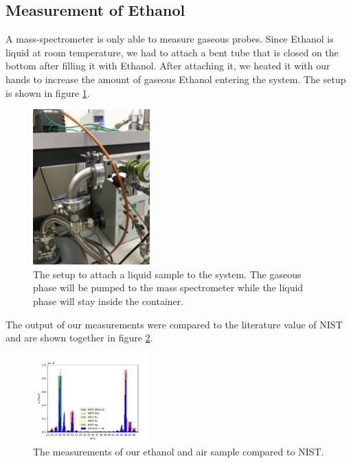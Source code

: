     
    \subsection{Measurement of Ethanol}
    
    
    A mass-spectrometer is only able to measure gaseous probes. Since Ethanol is liquid at room temperature, we had to attach a bent tube that is closed on the bottom after filling it with Ethanol. After attaching it, we heated it with our hands to increase the amount of gaseous Ethanol entering the system. The setup is shown in figure \ref{fig:ethanol}.
    \begin{figure}[h!]
    \centering
    \includegraphics[angle=-90, origin=c, width=0.4\textwidth]{Report/pictures/liquids.JPG}
    \caption{The setup to attach a liquid sample to the system. The gaseous phase will be pumped to the mass spectrometer while the liquid phase will stay inside the container.}
    \label{fig:ethanol}
    \end{figure}
    The output of our measurements were compared to the literature value of NIST \cite{NIST} and are shown together in figure \ref{fig:ethanol2}.
    \begin{figure}[h!]
    \centering
    \includegraphics[angle=-90, origin=c, width=0.4\textwidth]{Report/DataResultsPlots/ethanol2.pdf}
    \caption{The measurements of our ethanol and air sample compared to NIST.}
    \label{fig:ethanol2}
    \end{figure}
    
